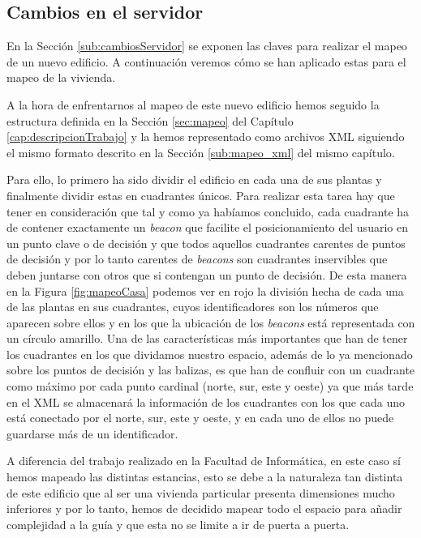 \subsection{Cambios en el servidor}
\label{sub:cambiosServidor_vivienda}

En la Sección \ref{sub:cambiosServidor} se exponen las claves para realizar el mapeo de un nuevo edificio. A continuación veremos cómo se han aplicado estas para el mapeo de la vivienda.


A la hora de enfrentarnos al mapeo de este nuevo edificio hemos seguido la estructura definida en la Sección \ref{sec:mapeo} del Capítulo \ref{cap:descripcionTrabajo} y la hemos representado como archivos XML siguiendo el mismo formato descrito en la Sección \ref{sub:mapeo_xml} del mismo capítulo.

Para ello, lo primero ha sido dividir el edificio en cada una de sus plantas y finalmente dividir estas en cuadrantes únicos. Para realizar esta tarea hay que tener en consideración que tal y como ya habíamos concluido, cada cuadrante ha de contener exactamente un \textit{beacon} que facilite el posicionamiento del usuario en un punto clave o de decisión y que todos aquellos cuadrantes carentes de puntos de decisión y por lo tanto carentes de \textit{beacons} son cuadrantes inservibles que deben juntarse con otros que si contengan un punto de decisión. De esta manera en la Figura \ref{fig:mapeoCasa} podemos ver en rojo la división hecha de cada una de las plantas en sus cuadrantes, cuyos identificadores son los números que aparecen sobre ellos y en los que la ubicación de los \textit{beacons} está representada con un círculo amarillo. Una de las características más importantes que han de tener los cuadrantes en los que dividamos nuestro espacio, además de lo ya mencionado sobre los puntos de decisión y las balizas, es que han de confluir con un cuadrante como máximo por cada punto cardinal (norte, sur, este y oeste) ya que más tarde en el XML se almacenará la información de los cuadrantes con los que cada uno está conectado por el norte, sur, este y oeste, y en cada uno de ellos no puede guardarse más de un identificador.

A diferencia del trabajo realizado en la Facultad de Informática, en este caso sí hemos mapeado las distintas estancias, esto se debe a la naturaleza tan distinta de este edificio que al ser una vivienda particular presenta dimensiones mucho inferiores y por lo tanto, hemos de decidido mapear todo el espacio para añadir complejidad a la guía y que esta no se limite a ir de puerta a puerta.

